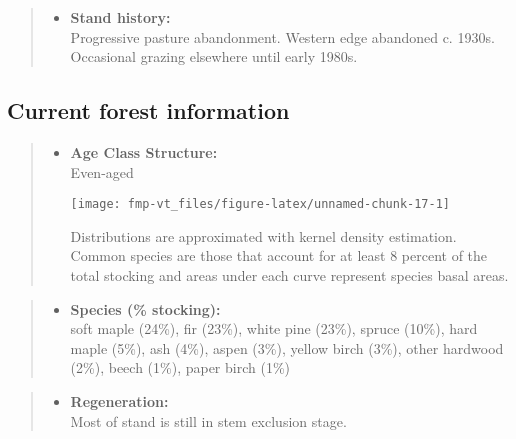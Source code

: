 \documentclass[]{tufte-handout}
\providecommand{\tightlist}{%
  \setlength{\itemsep}{0pt}\setlength{\parskip}{0pt}}
\begin{document}
\begin{quote}
\begin{itemize}
\tightlist
\item
  \textbf{Stand history:}\\
  \vspace{2pt} Progressive pasture abandonment. Western edge abandoned
  c. 1930s. Occasional grazing elsewhere until early 1980s.
\end{itemize}
\end{quote}

\subsection{Current forest
information}\label{current-forest-information-3}

\begin{quote}
\begin{itemize}
\tightlist
\item
  \textbf{Age Class Structure:}\\
  \vspace{2pt} Even-aged\\

  \begin{marginfigure}
  \texttt{[image: fmp-vt\_files/figure-latex/unnamed-chunk-17-1]} \caption[Distributions are approximated with kernel density estimation]{Distributions are approximated with kernel density estimation. Common species are those that account for at least 8 percent of the total stocking and areas under each curve represent species basal areas.}\label{fig:unnamed-chunk-17}
  \end{marginfigure}
\end{itemize}
\end{quote}

\begin{quote}
\begin{itemize}
\tightlist
\item
  \textbf{Species (\% stocking):}\\
  \vspace{2pt} soft maple (24\%), fir (23\%), white pine (23\%), spruce
  (10\%), hard maple (5\%), ash (4\%), aspen (3\%), yellow birch (3\%),
  other hardwood (2\%), beech (1\%), paper birch (1\%)
\end{itemize}
\end{quote}

\begin{quote}
\begin{itemize}
\tightlist
\item
  \textbf{Regeneration:}\\
  \vspace{2pt} Most of stand is still in stem exclusion stage.
\end{itemize}
\end{quote}
\end{document}
